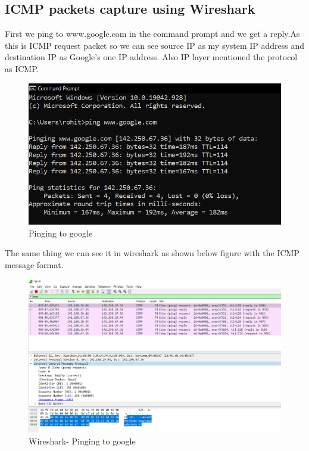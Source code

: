 \documentclass[12pt,a4paper]{article}
\begin{document}
\subsection{ICMP packets capture using Wireshark}
First we ping to www.google.com in the command prompt and we get a reply.As this is ICMP request packet so we can see source IP as my system IP address and destination IP as Google’s one IP address. Also IP layer mentioned the protocol as ICMP.
\begin{figure}[h]
 		\centering
				\includegraphics[scale=0.60]{6.7.png}	


			\caption{Pinging to google}
			\label{fig:AP}
	\end{figure}
\pagebreak

The same thing we can see it in wireshark as shown below figure with the ICMP message format.

\begin{figure}[h]
 		\centering
				\includegraphics[scale=0.3]{6.3.png}	


			\caption{Wireshark- Pinging to google}
			\label{fig:AP}
	\end{figure}
\end{document}
